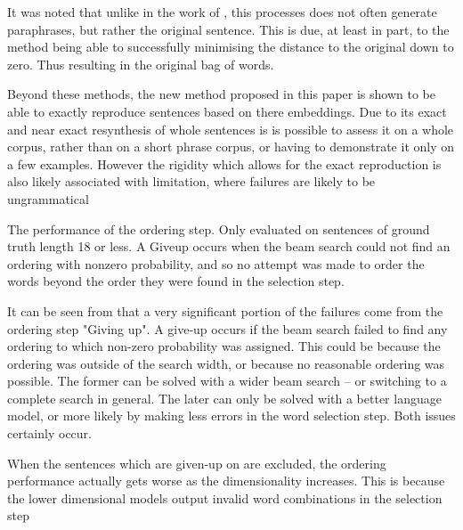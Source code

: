 \documentclass[11pt]{article}
\numberwithin{equation}{section}
\numberwithin{figure}{section}
\theoremstyle{plain}
\theoremstyle{definition}
\begin{document}
It was noted that unlike in the work of \textcite{iyyer2014generating}, this processes does not often generate paraphrases, but rather the original sentence. This is due, at least in part, to the method being able to successfully minimising the distance to the original down to zero. Thus resulting in the original bag of words.

Beyond these methods, the new method proposed in this paper is shown to be able to exactly reproduce sentences based on there embeddings.  Due to its exact and near exact resynthesis of whole sentences is is possible to assess it on a whole corpus, rather than on a short phrase corpus, or having to demonstrate it only on a few examples.  However the rigidity which allows for the exact reproduction is also likely associated with limitation, where failures are likely to be ungrammatical 

\begin{table}[t]
	\centering
	\caption{ The performance of the ordering step. Only evaluated on sentences of ground truth length 18 or less. A Giveup occurs when the beam search could not find an ordering with nonzero probability, and so no attempt was made to order the words beyond the order they were found in the selection step.}
	\label{table:ordering}
\end{table}

It can be seen from  that a very significant portion of the failures come from the ordering step "Giving up". A give-up occurs if the beam search failed to find any ordering to which non-zero probability was assigned. This could be because the ordering was outside of the search width, or because no reasonable ordering was possible. The former can be solved with a wider beam search -- or switching to a complete search in general. The later can only be solved with a better language model, or more likely by making less errors in the word selection step. Both issues certainly occur. 

When the sentences which are given-up on are excluded, the ordering performance actually gets worse as the dimensionality increases. This is because the lower dimensional models output invalid word combinations in the selection step
\end{document}
